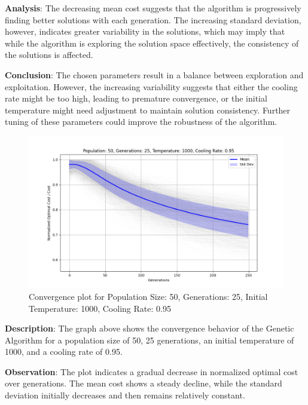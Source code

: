 \documentclass{article}
\begin{document}
    \textbf{Analysis}: The decreasing mean cost suggests that the algorithm is progressively finding better solutions with each generation. The increasing standard deviation, however, indicates greater variability in the solutions, which may imply that while the algorithm is exploring the solution space effectively, the consistency of the solutions is affected.

    \textbf{Conclusion}: The chosen parameters result in a balance between exploration and exploitation. However, the increasing variability suggests that either the cooling rate might be too high, leading to premature convergence, or the initial temperature might need adjustment to maintain solution consistency. Further tuning of these parameters could improve the robustness of the algorithm.

    \begin{figure}[H]
        \centering
        \includegraphics[width=\textwidth]{genetic_simulated_annealing_hybrid/Population_50_Generations_25_Temperature_1000_CoolingRate_0.95}
        \caption{Convergence plot for Population Size: 50, Generations: 25, Initial Temperature: 1000, Cooling Rate: 0.95}
        \label{fig:pop50_gen25_temp1000_cr0.95}
    \end{figure}

    \textbf{Description}: The graph above shows the convergence behavior of the Genetic Algorithm for a population size of 50, 25 generations, an initial temperature of 1000, and a cooling rate of 0.95.

    \textbf{Observation}: The plot indicates a gradual decrease in normalized optimal cost over generations. The mean cost shows a steady decline, while the standard deviation initially decreases and then remains relatively constant.
\end{document}
